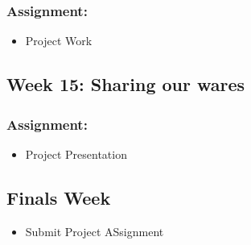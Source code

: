 \documentclass[]{article}
\begin{document}
\subsubsection{Assignment:}\label{assignment-12}

\begin{itemize}
\itemsep1pt\parskip0pt
\item
  Project Work
\end{itemize}

\subsection{Week 15: Sharing our wares}\label{week-15-sharing-our-wares}

\subsubsection{Assignment:}\label{assignment-13}

\begin{itemize}
\itemsep1pt\parskip0pt
\item
  Project Presentation
\end{itemize}

\subsection{Finals Week}\label{finals-week}

\begin{itemize}
\itemsep1pt\parskip0pt
\item
  Submit Project ASsignment
\end{itemize}
\end{document}
